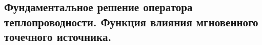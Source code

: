 \subsection{Фундаментальное решение оператора теплопроводности. Функция влияния мгновенного точечного источника.}